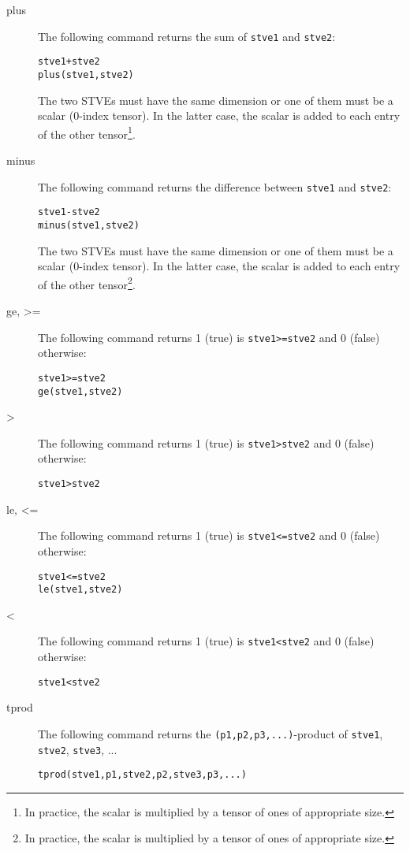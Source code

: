 \documentclass[11pt]{article}
\theoremstyle{remark}
\begin{document}
\begin{description}
\item[plus] The following command returns the sum of \lstinline{stve1}
  and \lstinline{stve2}:
\begin{lstlisting}
stve1+stve2
plus(stve1,stve2)
\end{lstlisting}
  The two STVEs must have the same dimension or one of them must be a
  scalar (0-index tensor). In the latter case, the scalar is added to
  each entry of the other tensor\footnote{In practice, the scalar is
    multiplied by a tensor of ones of appropriate size.}.

\item[minus] The following command returns the difference between
  \lstinline{stve1} and \lstinline{stve2}:
\begin{lstlisting}
stve1-stve2
minus(stve1,stve2)
\end{lstlisting}
  The two STVEs must have the same dimension or one of them must be a
  scalar (0-index tensor). In the latter case, the scalar is added to
  each entry of the other tensor\footnote{In practice, the scalar is
    multiplied by a tensor of ones of appropriate size.}.

\item[ge, >=] The following command returns 1 (true) is
  \lstinline{stve1>=stve2} and 0 (false) otherwise:
\begin{lstlisting}
stve1>=stve2
ge(stve1,stve2)
\end{lstlisting}

\item[>] The following command returns 1 (true) is
  \lstinline{stve1>stve2} and 0 (false) otherwise:
\begin{lstlisting}
stve1>stve2
\end{lstlisting}

\item[le, <=] The following command returns 1 (true) is
  \lstinline{stve1<=stve2} and 0 (false) otherwise:
\begin{lstlisting}
stve1<=stve2
le(stve1,stve2)
\end{lstlisting}

\item[<] The following command returns 1 (true) is
  \lstinline{stve1<stve2} and 0 (false) otherwise:
\begin{lstlisting}
stve1<stve2
\end{lstlisting}

\item[tprod] The following command returns the
  \lstinline{(p1,p2,p3,...)}-product of \lstinline{stve1},
  \lstinline{stve2}, \lstinline{stve3}, ...
\begin{lstlisting}
tprod(stve1,p1,stve2,p2,stve3,p3,...)
\end{lstlisting}


\end{description}
\end{document}
